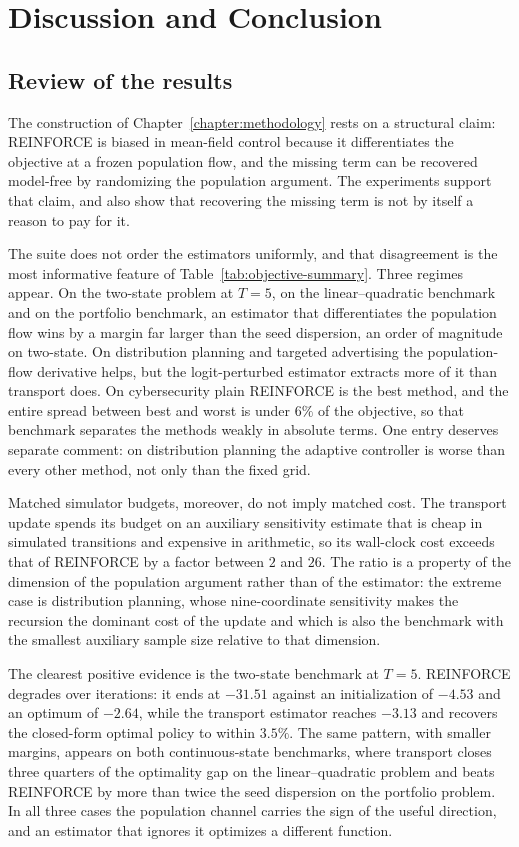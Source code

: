 \chapter{Discussion and Conclusion}
\label{chapter:discussion}

\section{Review of the results}
\label{sec:results-review}

The construction of Chapter~\ref{chapter:methodology} rests on a structural claim: REINFORCE is biased in mean-field control because it differentiates the objective at a frozen population flow, and the missing term can be recovered model-free by randomizing the population argument. The experiments support that claim, and also show that recovering the missing term is not by itself a reason to pay for it.

The suite does not order the estimators uniformly, and that disagreement is the most informative feature of Table~\ref{tab:objective-summary}. Three regimes appear. On the two-state problem at $T=5$, on the linear--quadratic benchmark and on the portfolio benchmark, an estimator that differentiates the population flow wins by a margin far larger than the seed dispersion, an order of magnitude on two-state. On distribution planning and targeted advertising the population-flow derivative helps, but the logit-perturbed estimator extracts more of it than transport does. On cybersecurity plain REINFORCE is the best method, and the entire spread between best and worst is under $6\%$ of the objective, so that benchmark separates the methods weakly in absolute terms. One entry deserves separate comment: on distribution planning the adaptive controller is worse than every other method, not only than the fixed grid.

Matched simulator budgets, moreover, do not imply matched cost. The transport update spends its budget on an auxiliary sensitivity estimate that is cheap in simulated transitions and expensive in arithmetic, so its wall-clock cost exceeds that of REINFORCE by a factor between $2$ and $26$. The ratio is a property of the dimension of the population argument rather than of the estimator: the extreme case is distribution planning, whose nine-coordinate sensitivity makes the recursion the dominant cost of the update and which is also the benchmark with the smallest auxiliary sample size relative to that dimension.

The clearest positive evidence is the two-state benchmark at $T=5$. REINFORCE degrades over iterations: it ends at $-31.51$ against an initialization of $-4.53$ and an optimum of $-2.64$, while the transport estimator reaches $-3.13$ and recovers the closed-form optimal policy to within $3.5\%$. The same pattern, with smaller margins, appears on both continuous-state benchmarks, where transport closes three quarters of the optimality gap on the linear--quadratic problem and beats REINFORCE by more than twice the seed dispersion on the portfolio problem. In all three cases the population channel carries the sign of the useful direction, and an estimator that ignores it optimizes a different function.

